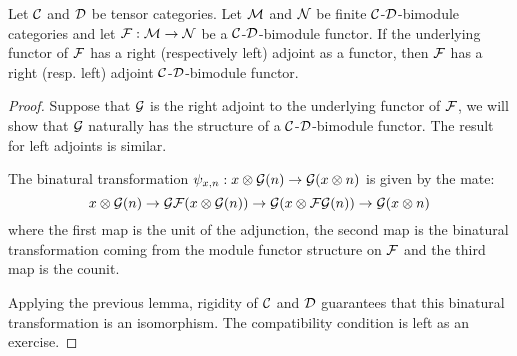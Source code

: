 \documentclass{amsart}
\begin{document}
\begin{lemma} \label{lma:module-adjoint}
Let $\mathcal C$ and $\mathcal D$ be tensor categories. Let  $\mathcal M$ and  $\mathcal N$  be finite $\mathcal C$-$\mathcal D$-bimodule categories and let $\mathcal F: \mathcal M \to \mathcal N$ be a $\mathcal C$-$\mathcal D$-bimodule functor.  If the underlying functor of $\mathcal F$ has a right (respectively left) adjoint as a functor, then $\mathcal F$ has a right (resp. left) adjoint $\mathcal C$-$\mathcal D$-bimodule functor. 
\end{lemma} 
\begin{proof}
Suppose that $\mathcal G$ is the right adjoint to the underlying functor of $\mathcal F$, we will show that $\mathcal G$ naturally has the structure of a $\mathcal C$-$\mathcal D$-bimodule functor.  The result for left adjoints is similar.

The binatural transformation $\psi_{x,n}: x \otimes \mathcal G(n) \rightarrow \mathcal G(x \otimes n)$ is given by the mate:
$$x \otimes \mathcal G(n) \rightarrow \mathcal G \mathcal F(x \otimes \mathcal G(n)) \rightarrow \mathcal G(x \otimes \mathcal F\mathcal G(n)) \rightarrow \mathcal G(x \otimes n)$$
where the first map is the unit of the adjunction, the second map is the binatural transformation coming from the module functor structure on $\mathcal F$ and the third map is the counit.  
\begin{center}
\end{center}

Applying the previous lemma, rigidity of $\mathcal C$ and $\mathcal D$ guarantees that this binatural transformation is an isomorphism.  The compatibility condition is left as an exercise.
\end{proof}
\end{document}
